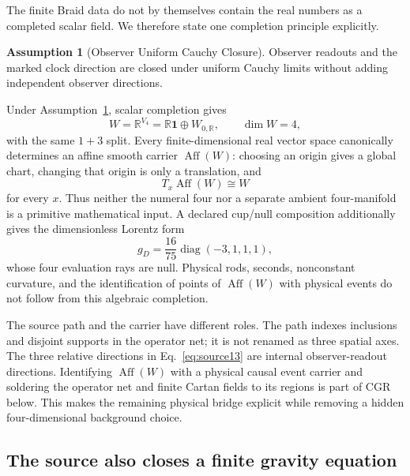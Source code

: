 \documentclass[11pt]{article}
\theoremstyle{definition}
\newtheorem{assumption}[theorem]{Assumption}
\theoremstyle{remark}
\newcommand{\id}{\mathbf{1}}
\begin{document}
The finite Braid data do not by themselves contain the real numbers as a completed scalar field. We therefore state one completion principle explicitly.
\begin{assumption}[Observer Uniform Cauchy Closure]\label{ass:rc}
Observer readouts and the marked clock direction are closed under uniform Cauchy limits without adding independent observer directions.
\end{assumption}
Under Assumption~\ref{ass:rc}, scalar completion gives
\begin{equation}\label{eq:affinecompletion}
 W=\mathbb R^{V_4}=\mathbb R\id\oplus W_{0,\mathbb R},
 \qquad \dim W=4,
\end{equation}
with the same $1+3$ split. Every finite-dimensional real vector space canonically determines an affine smooth carrier $\operatorname{Aff}(W)$: choosing an origin gives a global chart, changing that origin is only a translation, and
\begin{equation}\label{eq:tangentW}
 T_x\operatorname{Aff}(W)\cong W
\end{equation}
for every $x$. Thus neither the numeral four nor a separate ambient four-manifold is a primitive mathematical input. A declared cup/null composition additionally gives the dimensionless Lorentz form
\begin{equation}\label{eq:cupmetric}
 g_D=\frac{16}{75}\operatorname{diag}(-3,1,1,1),
\end{equation}
whose four evaluation rays are null. Physical rods, seconds, nonconstant curvature, and the identification of points of $\operatorname{Aff}(W)$ with physical events do not follow from this algebraic completion.

The source path and the carrier have different roles. The path indexes inclusions and disjoint supports in the operator net; it is not renamed as three spatial axes. The three relative directions in Eq.~\eqref{eq:source13} are internal observer-readout directions. Identifying $\operatorname{Aff}(W)$ with a physical causal event carrier and soldering the operator net and finite Cartan fields to its regions is part of CGR below. This makes the remaining physical bridge explicit while removing a hidden four-dimensional background choice.

\subsection{The source also closes a finite gravity equation}
\end{document}
